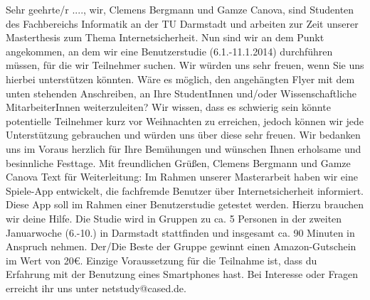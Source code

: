 Sehr geehrte/r ....,
\newline
\newline
wir, Clemens Bergmann und Gamze Canova, sind Studenten des Fachbereichs Informatik an der TU Darmstadt und arbeiten zur Zeit unserer Masterthesis zum Thema Internetsicherheit.
\newline
\newline
Nun sind wir an dem Punkt angekommen, an dem wir eine Benutzerstudie (6.1.-11.1.2014) durchf\"{u}hren m\"{u}ssen, f\"{u}r die wir Teilnehmer suchen. Wir w\"{u}rden uns sehr freuen, wenn Sie uns hierbei unterst\"{u}tzen k\"{o}nnten. W\"{a}re es m\"{o}glich, den angeh\"{a}ngten Flyer mit dem unten stehenden Anschreiben, an Ihre StudentInnen und/oder Wissenschaftliche MitarbeiterInnen  weiterzuleiten? Wir wissen, dass es schwierig sein k\"{o}nnte potentielle Teilnehmer kurz vor Weihnachten zu erreichen, jedoch k\"{o}nnen wir jede Unterst\"{u}tzung gebrauchen und w\"{u}rden uns \"{u}ber diese sehr freuen.
\newline
\newline
Wir bedanken uns im Voraus herzlich f\"{u}r Ihre Bem\"{u}hungen und w\"{u}nschen Ihnen erholsame und besinnliche Festtage.
\newline
\newline
Mit freundlichen Gr\"{u}{\ss}en, \newline
Clemens Bergmann und Gamze Canova
\newline
\newline
Text f\"{u}r Weiterleitung:
Im Rahmen unserer Masterarbeit haben wir eine Spiele-App entwickelt, die fachfremde Benutzer \"{u}ber Internetsicherheit informiert.  Diese App soll im Rahmen einer Benutzerstudie getestet werden. Hierzu brauchen wir deine Hilfe. Die Studie wird in Gruppen zu ca. 5 Personen in der zweiten Januarwoche (6.-10.) in Darmstadt stattfinden und insgesamt ca. 90 Minuten in Anspruch nehmen.  Der/Die Beste der Gruppe gewinnt einen Amazon-Gutschein im Wert von 20\euro.  Einzige Voraussetzung f\"{u}r die Teilnahme ist, dass du Erfahrung mit der Benutzung eines Smartphones hast. Bei Interesse oder Fragen erreicht ihr uns unter netstudy@cased.de. 



